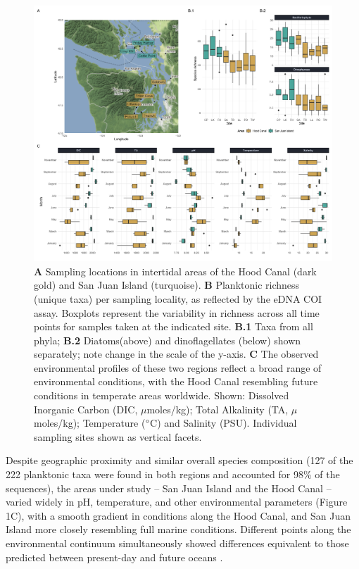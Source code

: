 \documentclass[11pt]{article}
\begin{document}
\begin{linenumbers}
\begin{figure}%
\centering
\includegraphics[width=1 \linewidth]{Figures_for_MS/Fig1.png}
\caption{\footnotesize {\textbf{A} Sampling locations in intertidal areas of the Hood Canal (dark gold) and San Juan Island (turquoise). \textbf{B} Planktonic richness (unique taxa) per sampling locality, as reflected by the eDNA COI assay. Boxplots represent the variability in richness across all time points for samples taken at the indicated site. \textbf{B.1} Taxa from all phyla; \textbf{B.2} Diatoms(above) and dinoflagellates (below) shown separately; note change in the scale of the y-axis. \textbf{C} The observed environmental profiles of these two regions reflect a broad range of environmental conditions, with the Hood Canal resembling future conditions in temperate areas worldwide. Shown: Dissolved Inorganic Carbon (DIC, $\mu$moles/kg); Total Alkalinity (TA, $\mu$moles/kg); Temperature ($\degree$C) and Salinity (PSU). Individual sampling sites shown as vertical facets.}}
\label{fig:Fig1}
\end{figure}


Despite geographic proximity and similar overall species composition (127 of the 222 planktonic taxa were found in both regions and accounted for 98\% of the sequences), the areas under study -- San Juan Island and the Hood Canal -- varied widely in pH, temperature, and other environmental parameters (Figure 1C), with a smooth gradient in conditions along the Hood Canal, and San Juan Island more closely resembling full marine conditions. Different points along the environmental continuum simultaneously showed differences equivalent to those predicted between present-day and future oceans \cite{bopp2013multiple}.


\end{linenumbers}
\end{document}
